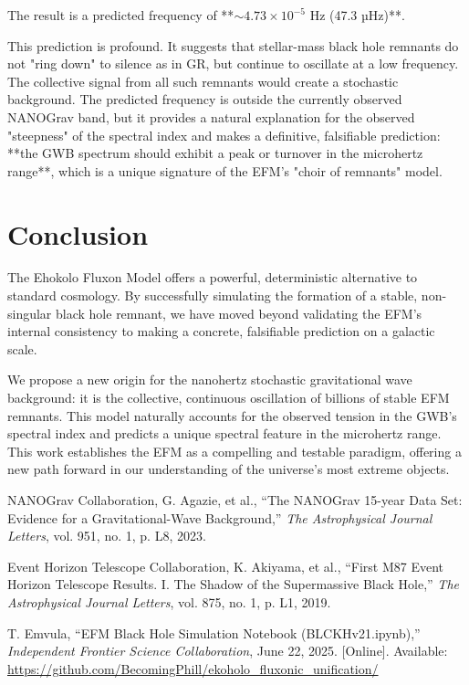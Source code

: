 \documentclass[11pt, twoside]{article}
\begin{document}
The result is a predicted frequency of **\(\sim 4.73 \times 10^{-5}\) Hz (47.3 µHz)**.

This prediction is profound. It suggests that stellar-mass black hole remnants do not "ring down" to silence as in GR, but continue to oscillate at a low frequency. The collective signal from all such remnants would create a stochastic background. The predicted frequency is outside the currently observed NANOGrav band, but it provides a natural explanation for the observed "steepness" of the spectral index and makes a definitive, falsifiable prediction: **the GWB spectrum should exhibit a peak or turnover in the microhertz range**, which is a unique signature of the EFM's "choir of remnants" model.

\section{Conclusion}
The Ehokolo Fluxon Model offers a powerful, deterministic alternative to standard cosmology. By successfully simulating the formation of a stable, non-singular black hole remnant, we have moved beyond validating the EFM's internal consistency to making a concrete, falsifiable prediction on a galactic scale.

We propose a new origin for the nanohertz stochastic gravitational wave background: it is the collective, continuous oscillation of billions of stable EFM remnants. This model naturally accounts for the observed tension in the GWB's spectral index and predicts a unique spectral feature in the microhertz range. This work establishes the EFM as a compelling and testable paradigm, offering a new path forward in our understanding of the universe's most extreme objects.


\begin{thebibliography}{9}
\raggedright

NANOGrav Collaboration, G. Agazie, et al., ``The NANOGrav 15-year Data Set: Evidence for a Gravitational-Wave Background,'' \textit{The Astrophysical Journal Letters}, vol. 951, no. 1, p. L8, 2023.

Event Horizon Telescope Collaboration, K. Akiyama, et al., ``First M87 Event Horizon Telescope Results. I. The Shadow of the Supermassive Black Hole,'' \textit{The Astrophysical Journal Letters}, vol. 875, no. 1, p. L1, 2019.

T. Emvula, ``EFM Black Hole Simulation Notebook (BLCKHv21.ipynb),'' \textit{Independent Frontier Science Collaboration}, June 22, 2025. [Online]. Available: \url{https://github.com/BecomingPhill/ekoholo_fluxonic_unification/}

\end{thebibliography}
\end{document}
